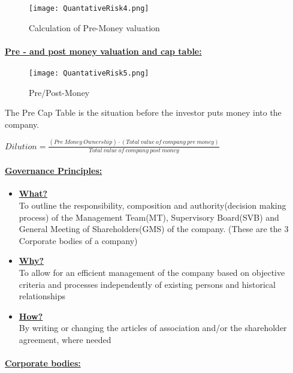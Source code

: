 \documentclass[8pt]{extreport}
\begin{document}
{\begin{figure}[h!]
  \centering\texttt{[image: QuantativeRisk4.png]}
  \caption{Calculation of Pre-Money valuation}
  \label{scenarioList}
\end{figure}\newpage
\paragraph{\underline{Pre - and post money valuation and cap table:}}
\begin{figure}[h!]
  \centering\texttt{[image: QuantativeRisk5.png]}
  \caption{Pre/Post-Money}
  \label{scenarioList}
\end{figure}
\small{The Pre Cap Table is the situation before the investor puts money into the company.}\\
\begin{center}
$Dilution = \frac{(Pre \ Money \ Ownership) \cdot (Total \ value \ of \ company \ pre \ money)}{Total \ value \ of \  company \ post \ money}$
\end{center}
\paragraph{\underline{Governance Principles:}}
\small{
\begin{itemize}
\item \underline{\textbf{What?}}\\ To outline the responsibility, composition and authority(decision making process) of the Management Team(MT), Supervisory Board(SVB) and General Meeting of Shareholders(GMS) of the company. (These are the 3 Corporate bodies of a company)
\item \underline{\textbf{Why?}}\\ To allow for an efficient management of the company based on objective criteria and processes independently of existing persons and historical relationships
\item \underline{\textbf{How?}}\\ By writing or changing the articles of association and/or the shareholder agreement, where needed
\end{itemize}
}
\paragraph{\underline{Corporate bodies:}\\ \\}

}
\end{document}
